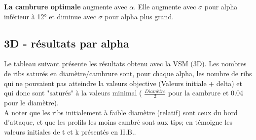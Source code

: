 \textbf{La cambrure optimale} augmente avec $\alpha$. Elle augmente avec $\sigma$ pour alpha inférieur à 12° et diminue avec $\sigma$ pour alpha plus grand.

\subsection{3D - résultats par alpha}

Le tableau suivant présente les résultats obtenu avec la VSM (3D). Les nombres de ribs saturés en diamètre/cambrure sont, pour chaque alpha, les nombre de ribs qui ne pouvaient pas atteindre la valeurs objective (Valeurs initiale + delta) et qui donc sont "saturés" à la valeurs minimal ( $\frac{Diamètre}{2}$ pour la cambrure et 0.04 pour le diamètre).\\

A noter que les ribs initialement à faible diamètre (relatif) sont ceux du bord d'attaque, et que les profils les moins cambré sont aux tips; en témoigne les valeurs initiales de t et k présentés en II.B..

